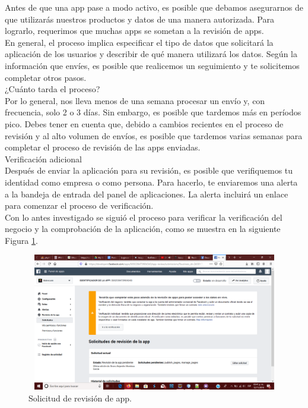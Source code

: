 	\noindent Antes de que una app pase a modo activo, es posible que debamos asegurarnos de que
	utilizarás nuestros productos y datos de una manera autorizada. Para lograrlo, requerimos que
	muchas apps se sometan a la revisión de apps.\\
	\noindent En general, el proceso implica especificar el tipo de datos que solicitará la aplicación de
	los usuarios y describir de qué manera utilizará los datos. Según la información que envíes, es
	posible que realicemos un seguimiento y te solicitemos completar otros pasos.\\
	\newline
	¿Cuánto tarda el proceso?\\
	\noindent Por lo general, nos lleva menos de una semana procesar un envío y, con frecuencia, solo
	2 o 3 días. Sin embargo, es posible que tardemos más en períodos pico. Debes tener en cuenta
	que, debido a cambios recientes en el proceso de revisión y al alto volumen de envíos, es posible
	que tardemos varias semanas para completar el proceso de revisión de las apps enviadas.\\
	\newline
	Verificación adicional \\
	\noindent Después de enviar la aplicación para su revisión, es posible que verifiquemos tu	identidad como empresa o como persona. Para hacerlo, te enviaremos una alerta a la bandeja de
	entrada del panel de aplicaciones. La alerta incluirá un enlace para comenzar el proceso de	verificación.\\ %
	
	\noindent Con lo antes investigado se siguió el proceso para verificar la verificación del negocio y
	la comprobación de la aplicación, como se muestra en la siguiente Figura \ref{creacionFB}.
	\pagebreak
	
	\begin{figure}[hbt!]
		\centering
		\includegraphics[width=15cm, height=6cm]{Imagenes/FacebookAPI/Facebook1}
		\caption{Solicitud de revisión de app.}
		\label{creacionFB}
	\end{figure}

